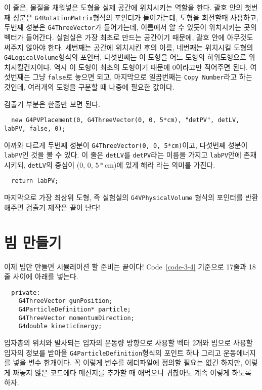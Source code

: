 이 줄은, 물질을 채워넣은 도형을 실제 공간에 위치시키는 역할을 한다. 괄호 안의
첫번째 성분은 \texttt{G4RotationMatrix}형식의 포인터가 들어가는데, 도형을
회전할때 사용하고, 두번째 성분은 \texttt{G4ThreeVector}가 들어가는데, 이름에서
알 수 있듯이 위치시키는 곳의 벡터가 들어간다. 실험실은 가장 최초로 만드는
공간이기 때문에, 괄호 안에 아무것도 써주지 않아야 한다. 세번째는 공간에
위치시킨 후의 이름, 네번째는 위치시킬 도형의 \texttt{G4LogicalVolume}형식의
포인터, 다섯번째는 이 도형을 어느 도형의 하위도형으로 위치시킬건지이다. 역시 이
도형이 최초의 도형이기 때문에 0이라고만 적어주면 된다. 여섯번째는 그냥
\texttt{false}로 놓으면 되고, 마지막으로 일곱번째는 \texttt{Copy Number}라고
하는 것인데, 여러개의 도형을 구분할 때 나중에 필요한 값이다.

검출기 부분은 한줄만 보면 된다.
\begin{pc}
\begin{lstlisting}
  new G4PVPlacement(0, G4ThreeVector(0, 0, 5*cm), "detPV", detLV, labPV, false, 0);
\end{lstlisting}
\end{pc}
아까와 다르게 두번째 성분이 \texttt{G4ThreeVector(0, 0, 5*cm)}이고, 다섯번째
성분이 \texttt{labPV}인 것을 볼 수 있다. 이 줄은 \texttt{detLV}를
\texttt{detPV}라는 이름을 가지고 \texttt{labPV}안에 존재시키되, \texttt{detLV}의
중심이 ($0$, $0$, $5*$cm)에 있게 해라 라는 의미를 가진다.
\begin{pc}
\begin{lstlisting}
  return labPV;
\end{lstlisting}
\end{pc}
마지막으로 가장 최상위 도형, 즉 실험실의 \texttt{G4VPhysicalVolume} 형식의
포인터를 반환해주면 검출기 제작은 끝이 난다!

\section{빔 만들기}

이제 빔만 만들면 시뮬레이션 할 준비는 끝이다! Code~\ref{code-3-4} 기준으로
17줄과 18줄 사이에 아래를 넣는다.
\begin{pc}
\begin{lstlisting}
  private:
    G4ThreeVector gunPosition;
    G4ParticleDefinition* particle;
    G4ThreeVector momentumDirection;
    G4double kineticEnergy;
\end{lstlisting}
\end{pc}
입자총의 위치와 발사되는 입자의 운동량 방향으로 사용할 벡터 2개와 빔으로 사용할
입자의 정보를 받아올 \texttt{G4ParticleDefinition}형식의 포인트 하나 그리고
운동에너지를 넣을 변수 한개이다. 꼭 이렇게 변수를 헤더파일에 정의할 필요는 없긴
하지만, 이렇게 짜놓지 않은 코드에다 메신저를 추가할 때 애먹으니 귀찮아도 계속
이렇게 하도록 하자.

